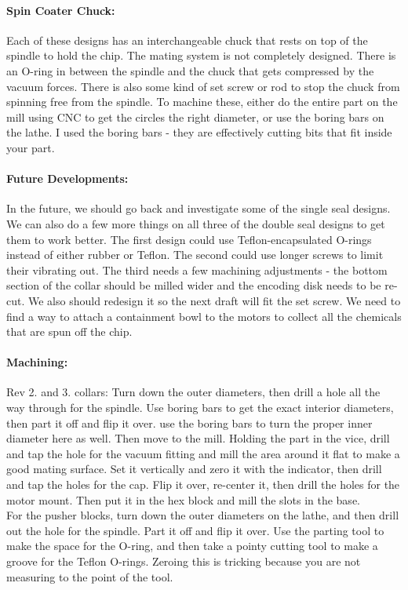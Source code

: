 \documentclass[12pt]{report}
\begin{document}
\paragraph{Spin Coater Chuck:} Each of these designs has an interchangeable chuck that rests on top of the spindle to hold the chip. The mating system is not completely designed. There is an O-ring in between the spindle and the chuck that gets compressed by the vacuum forces. There is also some kind of set screw or rod to stop the chuck from spinning free from the spindle. To machine these, either do the entire part on the mill using CNC to get the circles the right diameter, or use the boring bars on the lathe. I used the boring bars - they are effectively cutting bits that fit inside your part.


\paragraph{Future Developments:} In the future, we should go back and investigate some of the single seal designs. We can also do a few more things on all three of the double seal designs to get them to work better. The first design could use Teflon-encapsulated O-rings instead of either rubber or Teflon. The second could use longer screws to limit their vibrating out. The third needs a few machining adjustments - the bottom section of the collar should be milled wider and the encoding disk needs to be re-cut. We also should redesign it so the next draft will fit the set screw. We need to find a way to attach a containment bowl to the motors to collect all the chemicals that are spun off the chip.

\paragraph{Machining:} 
Rev 2. and 3. collars: Turn down the outer diameters, then drill a hole all the way through for the spindle. Use boring bars to get the exact interior diameters, then part it off and flip it over. use the boring bars to turn the proper inner diameter here as well. Then move to the mill. Holding the part in the vice, drill and tap the hole for the vacuum fitting and mill the area around it flat to make a good mating surface. Set it vertically and zero it with the indicator, then drill and tap the holes for the cap. Flip it over, re-center it, then drill the holes for the motor mount. Then put it in the hex block and mill the slots in the base. \\
For the pusher blocks, turn down the outer diameters on the lathe, and then drill out the hole for the spindle. Part it off and flip it over. Use the parting tool to make the space for the O-ring, and then take a pointy cutting tool to make a groove for the Teflon O-rings. Zeroing this is tricking because you are not measuring to the point of the tool.
\end{document}
